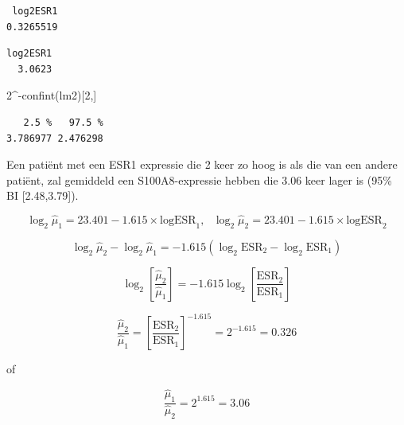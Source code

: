 \documentclass[
  dutch,
  letterpaper,
  12pt]{book}
\newenvironment{Shaded}{\begin{snugshade}}{\end{snugshade}}
\newcommand{\DecValTok}[1]{\textcolor[rgb]{0.68,0.00,0.00}{#1}}
\newcommand{\FunctionTok}[1]{\textcolor[rgb]{0.28,0.35,0.67}{#1}}
\newcommand{\NormalTok}[1]{\textcolor[rgb]{0.00,0.23,0.31}{#1}}
\newcommand{\SpecialCharTok}[1]{\textcolor[rgb]{0.37,0.37,0.37}{#1}}
\theoremstyle{definition}
\theoremstyle{definition}
\theoremstyle{definition}
\theoremstyle{remark}
\begin{document}
\begin{Shaded}
\end{Shaded}

\begin{verbatim}
 log2ESR1 
0.3265519 
\end{verbatim}

\begin{Shaded}
\end{Shaded}

\begin{verbatim}
log2ESR1 
  3.0623 
\end{verbatim}

\begin{Shaded}
\begin{Highlighting}[]
\DecValTok{2}\SpecialCharTok{\^{}{-}}\FunctionTok{confint}\NormalTok{(lm2)[}\DecValTok{2}\NormalTok{,]}
\end{Highlighting}
\end{Shaded}

\begin{verbatim}
   2.5 %   97.5 % 
3.786977 2.476298 
\end{verbatim}

Een patiënt met een ESR1 expressie die 2 keer zo hoog is als die van een
andere patiënt, zal gemiddeld een S100A8-expressie hebben die 3.06 keer
lager is (95\% BI {[}2.48,3.79{]}).

\[\log_2 \hat\mu_1=23.401  -1.615 \times \text{logESR}_1,\text{ } \log_2 \hat\mu_2=23.401  -1.615 \times \text{logESR}_2 \]

\[\log_2 \hat\mu_2-\log_2 \hat\mu_1=  -1.615 (\log_2 \text{ESR}_2-\log_2 \text{ESR}_1) \]

\[\log_2 \left[\frac{\hat\mu_2}{\hat\mu_1}\right]=  -1.615 \log_2\left[\frac{ \text{ESR}_2}{\text{ESR}_1}\right] \]

\[\frac{\hat\mu_2}{\hat\mu_1}=\left[\frac{ \text{ESR}_2}{\text{ESR}_1}\right]^{-1.615}=2^ {-1.615} =0.326\]

of

\[\frac{\hat\mu_1}{\hat\mu_2}=2^{1.615} =3.06\]
\end{document}

